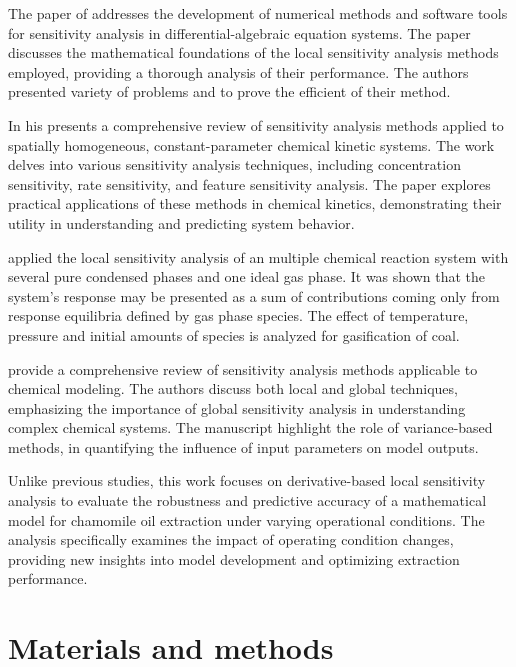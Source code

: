 \documentclass[a4paper,fleqn]{cas-dc}
\begin{document}
	{\color{blue}The paper of \citet{Maly1996} addresses the development of numerical methods and software tools for sensitivity analysis in differential-algebraic equation systems. The paper discusses the mathematical foundations of the local sensitivity analysis methods employed, providing a thorough analysis of their performance. The authors presented variety of problems and to prove the efficient of their method.
	
	In his \citet{Turanyi1990} presents a comprehensive review of sensitivity analysis methods applied to spatially homogeneous, constant-parameter chemical kinetic systems. The work delves into various sensitivity analysis techniques, including concentration sensitivity, rate sensitivity, and feature sensitivity analysis. The paper explores practical applications of these methods in chemical kinetics, demonstrating their utility in understanding and predicting system behavior.
	
	\citet{Fishtik1997} applied the local sensitivity analysis of an multiple chemical reaction system with several pure condensed phases and one ideal gas phase. It was shown that the system's response may be presented as a sum of contributions coming only from response equilibria defined by gas phase species. The effect of temperature, pressure and initial amounts of species is analyzed for gasification of coal.
	
	\citet{Saltelli2005} provide a comprehensive review of sensitivity analysis methods applicable to chemical modeling. The authors discuss both local and global techniques, emphasizing the importance of global sensitivity analysis in understanding complex chemical systems. The manuscript highlight the role of variance-based methods, in quantifying the influence of input parameters on model outputs.
	
	Unlike previous studies, this work focuses on derivative-based local sensitivity analysis to evaluate the robustness and predictive accuracy of a mathematical model for chamomile oil extraction under varying operational conditions. The analysis specifically examines the impact of operating condition changes, providing new insights into model development and optimizing extraction performance.}
	
	
	\section{Materials and methods} \label{CH: Materials and methods}
	
\end{document}
